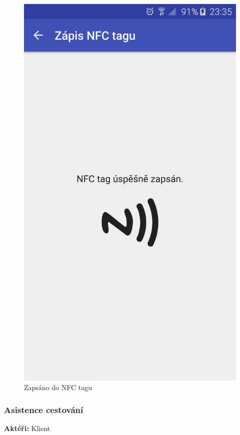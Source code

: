 \documentclass[czech,master,public,dept460,male,java,cpdeclaration]{diploma}
\newcommand{\usecase}[2]{\subsubsection{#1}\label{#2}}
\begin{document}
\begin{figure}[H]
\begin{minipage}{.5\textwidth}
    \centering
                    \includegraphics[scale=0.14]{img/screen/zapisdonfc.png}
            \caption{Zapsáno do NFC tagu}
            \label{fig:nfczapsano}

       \end{minipage}
\end{figure}

\usecase{Asistence cestování}{asistence}
\textbf{Aktéři:} Klient
\end{document}
